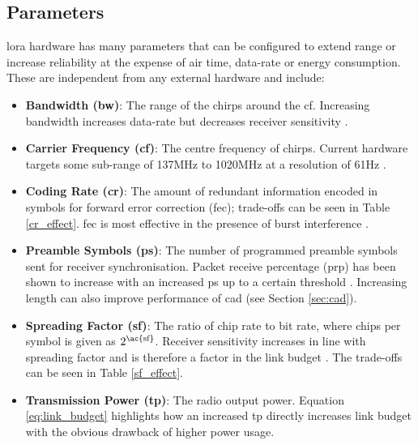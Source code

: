 \subsection{Parameters}
\ac{lora} hardware has many parameters that can be configured to extend range or increase reliability at the expense of air time, data-rate or energy consumption. These are independent from any external hardware and include:
\begin{itemize}
    \item \textbf{Bandwidth (\ac{bw})}: The range of the chirps around the \ac{cf}. Increasing bandwidth increases data-rate but decreases receiver sensitivity \cite{3YP:STUDY_OF_LORA}.
    \item \textbf{Carrier Frequency (\ac{cf})}: The centre frequency of chirps. Current hardware targets some sub-range of 137MHz to 1020MHz at a resolution of 61Hz \cite{3YP:LORA_SX12}. 
    \item \textbf{Coding Rate (\ac{cr})}: The amount of redundant information encoded in symbols for forward error correction (\ac{fec}); trade-offs can be seen in Table \ref{cr_effect}. \ac{fec} is most effective in the presence of burst interference \cite{3YP:LORA_MOD_BASICS}.
    \item \textbf{Preamble Symbols (\ac{ps})}: The number of programmed preamble symbols sent for receiver synchronisation. Packet receive percentage (\ac{prp}) has been shown to increase with an increased \ac{ps} up to a certain threshold \cite{3YP:LORA_PERFORMANCE}. Increasing length can also improve performance of \ac{cad} (see Section \ref{sec:cad}).
    \item \textbf{Spreading Factor (\ac{sf})}: The ratio of chip rate to bit rate, where chips per symbol is given as $2^{\text{\ac{sf}}}$. Receiver sensitivity increases in line with spreading factor and is therefore a factor in the link budget \cite{3YP:LORA_SX12}. The trade-offs can be seen in Table \ref{sf_effect}.
    \item \textbf{Transmission Power (\ac{tp})}: The radio output power. Equation \ref{eq:link_budget} highlights how an increased \ac{tp} directly increases link budget with the obvious drawback of higher power usage. 
\end{itemize}


